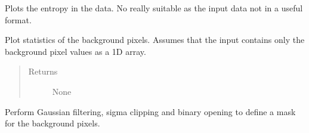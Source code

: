 \documentclass[a4paper,11pt,english]{sphinxmanual}
\begin{document}

\begin{fulllineitems}
\label{reduction:analysis.analyseBackground.plotEntropy}
Plots the entropy in the data. No really suitable as the input data
not in a useful format.

\end{fulllineitems}


\begin{fulllineitems}
\label{reduction:analysis.analyseBackground.plotStatistcs}
Plot statistics of the background pixels. Assumes that the input contains only
the background pixel values as a 1D array.
\begin{quote}\begin{description}
\item[{Returns}] \leavevmode
None

\end{description}\end{quote}

\end{fulllineitems}


\begin{fulllineitems}
\label{reduction:analysis.analyseBackground.sigmaClippedOpening}
Perform Gaussian filtering, sigma clipping and binary opening to define
a mask for the background pixels.

\end{fulllineitems}

\label{reduction:module-analysis.analyseBackgroundSubtraction}
\end{document}
